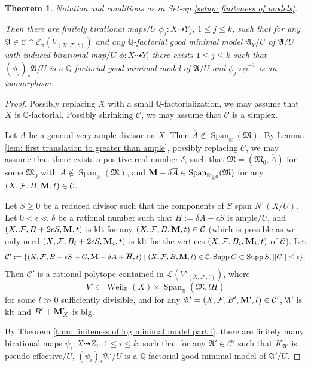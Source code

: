 \documentclass[12pt]{amsart}
\numberwithin{equation}{section}
\newcommand{\Mm}{{\bf{M}}}
\newcommand{\Span}{\operatorname{Span}}
\newcommand{\Weil}{\operatorname{Weil}}
\newcommand{\Supp}{\operatorname{Supp}}
\newcommand{\Aa}{{\mathfrak{A}}}
\newcommand{\Ff}{\mathcal{F}}
\newcommand{\MM}{{\mathfrak{M}}}
\newtheorem{thm}{Theorem}[section]
\theoremstyle{definition}
\theoremstyle{definition}
\theoremstyle{definition}
\begin{document}
\begin{thm}\label{thm: finiteness of log minimal model part ii}
Notation and conditions as in Set-up \ref{setup: finiteness of models}.

Then there are finitely birational maps$/U$ $\phi_j: X\dashrightarrow Y_j$, $1\leq j\leq k$, such that for any $\Aa\in\mathcal{C}\cap\mathcal{E}_{\pi}(V_{(X,\Ff,t)})$ and any $\mathbb Q$-factorial good minimal model $\Aa_Y/U$ of $\Aa/U$ with induced birational map$/U$ $\phi\colon X\dashrightarrow Y$, there exists $1\leq j\leq k$ such that $(\phi_j)_*\Aa/U$ is a $\mathbb Q$-factorial good minimal model of $\Aa/U$ and $\phi_j\circ\phi^{-1}$ is an isomorphism.
\end{thm}
\begin{proof}
    Possibly replacing $X$ with a small $\mathbb Q$-factorialization, we may assume that $X$ is $\mathbb Q$-factorial. Possibly shrinking $\mathcal{C}$, we may assume that $\mathcal{C}$ is a simplex. 

    Let $A$ be a general very ample divisor on $X$. Then $\overline{A}\not\in\Span_{\mathbb R}(\MM)$. By Lemma \ref{lem: first translation to greater than ample}, possibly replacing $\mathcal{C}$, we may assume that there exists a positive real number $\delta$, such that $\MM=(\MM_0,\overline{A})$ for some $\MM_0$ with $\overline{A}\not\in\Span_{\mathbb R}(\MM)$, and $\Mm-\delta\overline{A}\in\Span_{\mathbb R_{\geq 0}}(\MM)$ for any $(X,\Ff,B,\Mm,t)\in\mathcal{C}$. 
    
    Let $S\geq 0$ be a reduced divisor such that the components of $S$ span $N^1(X/U)$. Let $0<\epsilon\ll\delta$ be a rational number such that $H:=\delta A-\epsilon S$ is ample$/U$, and $(X,\Ff,B+2\epsilon S,\Mm,t)$ is klt for any $(X,\Ff,B,\Mm,t)\in\mathcal{C}$ (which is possible as we only need $(X,\Ff,B_i+2\epsilon S,\Mm_i,t)$ is klt for the vertices $(X,\Ff,B_i,\Mm_i,t)$
    of $\mathcal{C}$). Let
    $$\mathcal{C}':=\{(X,\Ff,B+\epsilon S+C,\Mm-\delta A+\overline{H},t)\mid (X,\Ff,B,\Mm,t)\in\mathcal{C},\Supp C\subset\Supp S, ||C||\leq\epsilon\}.$$
    Then $\mathcal{C}'$ is a rational polytope contained in $\mathcal{L}(V'_{(X,\Ff,t)})$, where $$V'\subset\Weil_{\mathbb R}(X)\times\Span_{\mathbb R}(\MM,l\overline{H})$$ for some $l\gg 0$ sufficiently divisible, and for any $\Aa'=(X,\Ff,B',\Mm',t)\in\mathcal{C}'$, $\Aa'$ is klt and $B'+\Mm_{X}'$
    is big. 
    
    By Theorem \ref{thm: finiteness of log minimal model part i}, there are finitely many birational maps $\psi_i: X\dashrightarrow Z_i$, $1\leq i\leq k$, such that for any $\Aa'\in\mathcal{C}'$ such that $K_{\Aa'}$ is pseudo-effective$/U$, $(\psi_i)_*\Aa'/U$ is a $\mathbb Q$-factorial good minimal model of $\Aa'/U$.


\end{proof}
\end{document}
